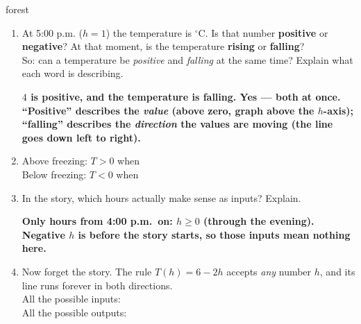 \documentclass[12pt]{article}
\newcommand{\answerspace}[2]{\par\nopagebreak\noindent\begin{minipage}[t][#1][t]{\linewidth}%
  \color{keyred}\bfseries #2\end{minipage}\par}
\begin{document}
\begin{scenariobox}{forest}
\begin{enumerate}[label=\textbf{\alph*.}, start=3, leftmargin=1.8em, itemsep=8pt]
  \item At 5:00 p.m. ($h=1$) the temperature is  $^\circ$C. Is that number
        \textbf{positive} or \textbf{negative}? At that moment, is the temperature \textbf{rising}
        or \textbf{falling}? \\[4pt]
        So: can a temperature be \emph{positive} and \emph{falling} at the same time? Explain
        what each word is describing.
        \answerspace{2.6cm}{$4$ is positive, and the temperature is falling. Yes --- both at once. ``Positive'' describes the \emph{value} (above zero, graph above the $h$-axis); ``falling'' describes the \emph{direction} the values are moving (the line goes down left to right).}
  \item Above freezing: $T>0$ when  \\[6pt]
        Below freezing: $T<0$ when 
  \item In the story, which hours actually make sense as inputs? Explain.
        \answerspace{1.8cm}{Only hours from 4:00 p.m.\ on: $h \ge 0$ (through the evening). Negative $h$ is before the story starts, so those inputs mean nothing here.}
  \item Now forget the story. The rule $T(h) = 6 - 2h$ accepts \emph{any} number $h$, and its
        line runs forever in both directions. \\[6pt]
        All the possible inputs:  \\[6pt]
        All the possible outputs: 
\end{enumerate}
\end{scenariobox}
\end{document}
